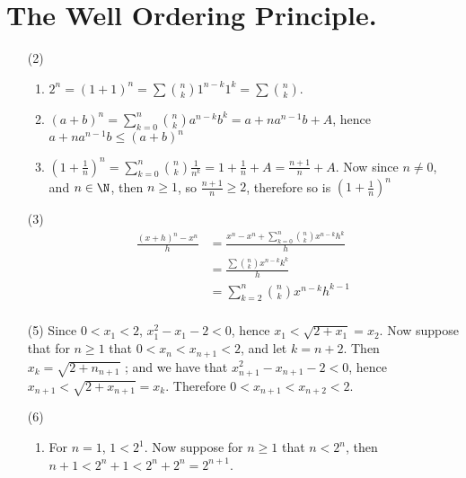 
\section{The Well Ordering Principle.}

\begin{enumerate}[label=(\arabic*)]
    \item [(2)]
        \begin{enumerate}
            \item $2^n=(1+1)^n=\sum {n \choose k}1^{n-k}1^k=\sum {n \choose k}$.

            \item $(a+b)^n=\sum_{k=0}^{n} {n \choose k}a^{n-k}b^k=a+na^{n-1}b+A$, hence $a+na^{n-1}b \leq (a+b)^n$

            \item $(1+\frac{1}{n})^n=\sum_{k=0}^{n} {n \choose k} \frac{1}{n^k} = 1+\frac{1}{n}+A=\frac{n+1}{n}+A$. Now since 
                $n \neq 0$, and  $n \in \N$, then  $n \geq 1$, so  $\frac{n+1}{n} \geq 2$, therefore so is $(1+\frac{1}{n})^n$
        \end{enumerate}

    \item [(3)]
        \begin{align*}
            \frac{(x+h)^n-x^n}{h} &= \frac{x^n-x^n+\sum_{k=0}^{n} {n \choose k} x^{n-k}h^k}{h} \\ 
                                  &= \frac{\sum {n \choose k} x^{n-k}k^k}{h} \\
                                  &= \sum_{k=2}^{n} {n \choose k} x^{n-k}h^{k-1} \\
        \end{align*}  

    \item [(5)] Since $0<x_1<2$, $x_1^2-x_1-2<0$, hence $x_1<\sqrt{2+x_1}=x_2$. Now suppose that for $n \geq 1$ that  
        $0<x_n<x_{n+1}<2$, and let  $k=n+2$. Then  $x_k=\sqrt{2+n_{n+1}}$ ; and we have that $x_{n+1}^2-x_{n+1}-2<0$, hence 
        $x_{n+1}<\sqrt{2+x_{n+1}}=x_k$. Therefore  $0<x_{n+1}<x_{n+2}<2$.

    \item  [(6)]
        \begin{enumerate}
            \item For $n=1$,  $1<2^1$. Now suppose for $n \geq 1$ that $n<2^n$, then $n+1<2^n+1<2^n+2^n=2^{n+1}$.


\end{enumerate}
\end{enumerate}
